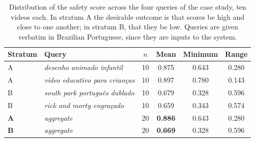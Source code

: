 \begin{table}[!t]
\centering
\caption{Distribution of the safety score across the four queries of the case study, ten videos each. In stratum A the desirable outcome is that scores be high and close to one another; in stratum B, that they be low. Queries are given verbatim in Brazilian Portuguese, since they are inputs to the system.}
\label{tab:estratos}
\begin{tabular}{llcccc}
\hline
Stratum & Query & $n$ & Mean & Minimum & Range \\
\hline
A & \emph{desenho animado infantil} & 10 & 0.875 & 0.643 & 0.280 \\
A & \emph{vídeo educativo para crianças} & 10 & 0.897 & 0.780 & 0.143 \\
B & \emph{south park português dublado} & 10 & 0.679 & 0.328 & 0.596 \\
B & \emph{rick and morty engraçado} & 10 & 0.659 & 0.343 & 0.574 \\
\hline
\textbf{A} & \emph{aggregate} & 20 & \textbf{0.886} & 0.643 & 0.280 \\
\textbf{B} & \emph{aggregate} & 20 & \textbf{0.669} & 0.328 & 0.596 \\
\hline
\end{tabular}
\end{table}
